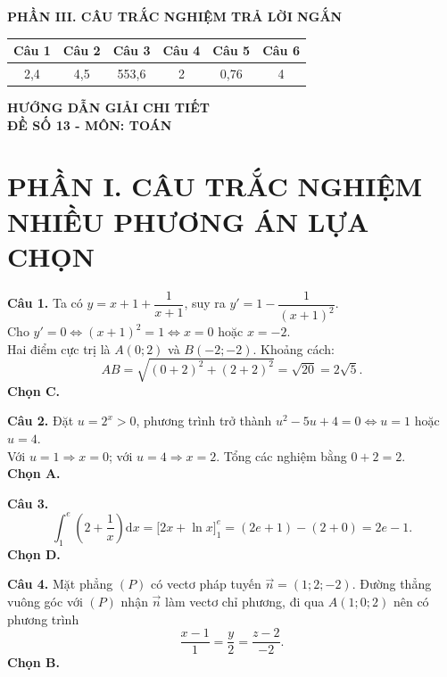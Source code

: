 \documentclass[12pt,a4paper]{article}
\begin{document}
\vspace{0.3cm}
\noindent\textbf{\large PHẦN III. CÂU TRẮC NGHIỆM TRẢ LỜI NGẮN}
\begin{center}
\renewcommand{\arraystretch}{1.25}
\begin{tabular}{|c|c|c|c|c|c|}
\hline
\textbf{Câu 1} & \textbf{Câu 2} & \textbf{Câu 3} & \textbf{Câu 4} & \textbf{Câu 5} & \textbf{Câu 6} \\ \hline
2,4 & 4,5 & 553,6 & 2 & 0,76 & 4 \\ \hline
\end{tabular}
\end{center}

\newpage
\begin{center}
    {\Large\textbf{HƯỚNG DẪN GIẢI CHI TIẾT}}\\[4pt]
    \textbf{ĐỀ SỐ 13 - MÔN: TOÁN}
\end{center}
\vspace{0.3cm}

\section*{\large PHẦN I. CÂU TRẮC NGHIỆM NHIỀU PHƯƠNG ÁN LỰA CHỌN}

\noindent\textbf{Câu 1.} Ta có $y = x + 1 + \dfrac{1}{x + 1}$, suy ra $y' = 1 - \dfrac{1}{(x + 1)^2}$.\\
Cho $y' = 0 \iff (x + 1)^2 = 1 \iff x = 0$ hoặc $x = -2$.\\
Hai điểm cực trị là $A(0; 2)$ và $B(-2; -2)$. Khoảng cách:
\[
AB = \sqrt{(0 + 2)^2 + (2 + 2)^2} = \sqrt{20} = 2\sqrt{5}.
\]
\textbf{Chọn C.}

\vspace{0.25cm}
\noindent\textbf{Câu 2.} Đặt $u = 2^x > 0$, phương trình trở thành $u^2 - 5u + 4 = 0 \iff u = 1$ hoặc $u = 4$.\\
Với $u = 1 \Rightarrow x = 0$; với $u = 4 \Rightarrow x = 2$. Tổng các nghiệm bằng $0 + 2 = 2$.\\
\textbf{Chọn A.}

\vspace{0.25cm}
\noindent\textbf{Câu 3.}
\[
\int_1^e \left(2 + \dfrac{1}{x}\right)\mathrm{d}x = \Big[2x + \ln x\Big]_1^e = (2e + 1) - (2 + 0) = 2e - 1.
\]
\textbf{Chọn D.}

\vspace{0.25cm}
\noindent\textbf{Câu 4.} Mặt phẳng $(P)$ có vectơ pháp tuyến $\vec{n} = (1; 2; -2)$. Đường thẳng vuông góc với $(P)$ nhận $\vec{n}$ làm vectơ chỉ phương, đi qua $A(1; 0; 2)$ nên có phương trình
\[
\dfrac{x - 1}{1} = \dfrac{y}{2} = \dfrac{z - 2}{-2}.
\]
\textbf{Chọn B.}
\end{document}
